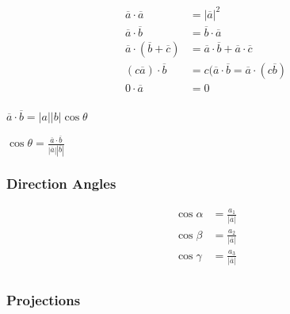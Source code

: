 \begin{align*}
	\overline{a} \cdot \overline{a} &=  \left| \overline{a} \right|^2\\
	\overline{a} \cdot \overline{b} &= \overline{b} \cdot \overline{a} \\
	\overline{a} \cdot (\overline{b} + \overline{c}) &= \overline{a} \cdot \overline{b} + \overline{a} \cdot \overline{c} \\
	(c\overline{a}) \cdot \overline{b} &=  c(\overline{a} \cdot \overline{b} = \overline{a} \cdot (c \overline{b}) \\
	0 \cdot \overline{a} &=  0 \\
\end{align*}

\begin{theorem}
$	\overline{a} \cdot \overline{b} = \left| a \right| \left| b \right| \cos \theta $
\end{theorem}

\begin{corollary}[]
	$\cos \theta = \frac{\overline{a} \cdot\overline{b}}{\left| \overline{a} \right| \left| \overline{b} \right| }$
\end{corollary}

\subsubsection{Direction Angles}%
\label{ssub:direction_angles}

\begin{align*}
	\cos \alpha &=  \frac{a_1}{\left| \overline{a} \right| } \\
	\cos \beta &= \frac{a_2}{\left| \overline{a} \right| } \\
	\cos \gamma &= \frac{a_3}{\left| \overline{a} \right| } \\
\end{align*}

\subsubsection{Projections}%
\label{ssub:projections}



